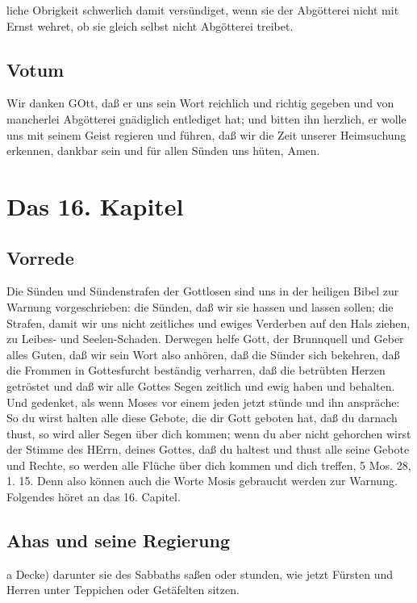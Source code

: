 liche Obrigkeit schwerlich damit versündiget, wenn sie der Abgötterei nicht mit Ernst wehret, ob sie gleich selbst nicht Abgötterei treibet.

\section{Votum}

Wir danken GOtt, daß er uns sein Wort reichlich und richtig gegeben und von mancherlei Abgötterei gnädiglich entlediget hat; und bitten ihn herzlich, er wolle uns mit seinem Geist regieren und führen, daß wir die Zeit unserer Heimsuchung erkennen, dankbar sein und für allen Sünden uns hüten, Amen.

\chapter{Das 16. Kapitel}

\section{Vorrede}

Die Sünden und Sündenstrafen der Gottlosen sind uns in der heiligen Bibel zur Warnung vorgeschrieben: die Sünden, daß wir sie hassen und lassen sollen; die Strafen, damit wir uns nicht zeitliches und ewiges Verderben auf den Hals ziehen, zu Leibes- und Seelen-Schaden. Derwegen helfe Gott, der Brunnquell und Geber alles Guten, daß wir sein Wort also anhören, daß die Sünder sich bekehren, daß die Frommen in Gottesfurcht beständig verharren, daß die betrübten Herzen getröstet und daß wir alle Gottes Segen zeitlich und ewig haben und behalten. Und gedenket, als wenn Moses vor einem jeden jetzt stünde und ihn anspräche: So du wirst halten alle diese Gebote, die dir Gott geboten hat, daß du darnach thust, so wird aller Segen über dich kommen; wenn du aber nicht gehorchen wirst der Stimme des HErrn, deines Gottes, daß du haltest und thust alle seine Gebote und Rechte, so werden alle Flüche über dich kommen und dich treffen, 5 Mos. 28, 1. 15. Denn also können auch die Worte Mosis gebraucht werden zur Warnung. Folgendes höret an das 16. Capitel.

\section{Ahas und seine Regierung}

a Decke) darunter sie des Sabbaths saßen oder stunden, wie jetzt Fürsten und Herren unter Teppichen oder Getäfelten sitzen.

